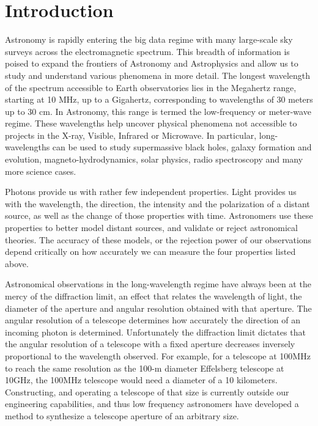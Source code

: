 \section{Introduction}\label{sec:intro_intro}

Astronomy is rapidly entering the big data regime with many large-scale sky surveys across the electromagnetic spectrum. This breadth of information is poised to expand the frontiers of Astronomy and Astrophysics and allow us to study and understand various phenomena in more detail. The longest wavelength of the spectrum accessible to Earth observatories lies in the Megahertz range, starting at 10 MHz, up to a Gigahertz, corresponding to wavelengths of 30 meters up to 30 cm. In Astronomy, this range is termed the low-frequency or meter-wave regime. These wavelengths help uncover physical phenomena not accessible to projects in the X-ray, Visible, Infrared or Microwave. In particular, long-wavelengths can be used to study supermassive black holes, galaxy formation and evolution, magneto-hydrodynamics, solar physics, radio spectroscopy and many more science cases.

Photons provide us with rather few independent properties. Light provides us with the wavelength, the direction, the intensity  and the polarization of a distant source, as well as the change of those properties with time. Astronomers use these properties to better model distant sources, and validate or reject astronomical theories. The accuracy of these models, or the rejection power of our observations depend critically on how accurately we can measure the four properties listed above. 

Astronomical observations in the long-wavelength regime have always been at the mercy of the diffraction limit, an effect that relates the wavelength of light, the diameter of the aperture and angular resolution obtained with that aperture. The angular resolution of a telescope determines how accurately the direction of an incoming photon is determined. Unfortunately the diffraction limit dictates that the angular resolution of a telescope with a fixed aperture decreases inversely proportional to the wavelength observed. For example, for a telescope at 100MHz to reach the same resolution as the 100-m diameter Effelsberg telescope at 10GHz, the 100MHz telescope would need a diameter of a 10 kilometers. Constructing, and operating a telescope of that size is currently outside our engineering capabilities, and thus low frequency astronomers have developed a method to synthesize a telescope aperture of an arbitrary size. 

